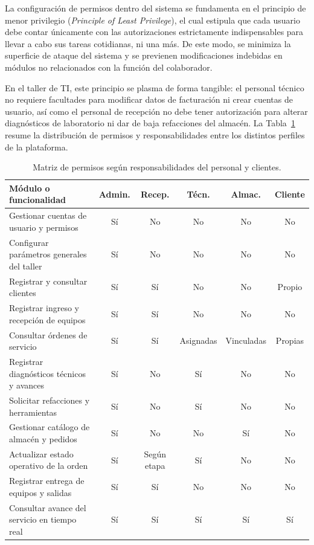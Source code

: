 La configuración de permisos dentro del sistema se fundamenta en el principio de menor privilegio (\textit{Principle of Least Privilege}), el cual estipula que cada usuario debe contar únicamente con las autorizaciones estrictamente indispensables para llevar a cabo sus tareas cotidianas, ni una más. De este modo, se minimiza la superficie de ataque del sistema y se previenen modificaciones indebidas en módulos no relacionados con la función del colaborador.

En el taller de TI, este principio se plasma de forma tangible: el personal técnico no requiere facultades para modificar datos de facturación ni crear cuentas de usuario, así como el personal de recepción no debe tener autorización para alterar diagnósticos de laboratorio ni dar de baja refacciones del almacén. La Tabla~\ref{tab:matriz_permisos} resume la distribución de permisos y responsabilidades entre los distintos perfiles de la plataforma.

\begin{table}[H]
    \centering
    \caption{Matriz de permisos según responsabilidades del personal y clientes.}
    \label{tab:matriz_permisos}
    \small
    \begin{tabularx}{\textwidth}{|X|c|c|c|c|c|}
        \hline
        \rowcolor{gray!15}
        \textbf{Módulo o funcionalidad} & \textbf{Admin.} & \textbf{Recep.} & \textbf{Técn.} & \textbf{Almac.} & \textbf{Cliente} \\ \hline
        Gestionar cuentas de usuario y permisos & Sí & No & No & No & No \\ \hline
        Configurar parámetros generales del taller & Sí & No & No & No & No \\ \hline
        Registrar y consultar clientes & Sí & Sí & No & No & Propio \\ \hline
        Registrar ingreso y recepción de equipos & Sí & Sí & No & No & No \\ \hline
        Consultar órdenes de servicio & Sí & Sí & Asignadas & Vinculadas & Propias \\ \hline
        Registrar diagnósticos técnicos y avances & Sí & No & Sí & No & No \\ \hline
        Solicitar refacciones y herramientas & Sí & No & Sí & No & No \\ \hline
        Gestionar catálogo de almacén y pedidos & Sí & No & No & Sí & No \\ \hline
        Actualizar estado operativo de la orden & Sí & Según etapa & Sí & No & No \\ \hline
        Registrar entrega de equipos y salidas & Sí & Sí & No & No & No \\ \hline
        Consultar avance del servicio en tiempo real & Sí & Sí & Sí & Sí & Sí \\ \hline
    \end{tabularx}
\end{table}

